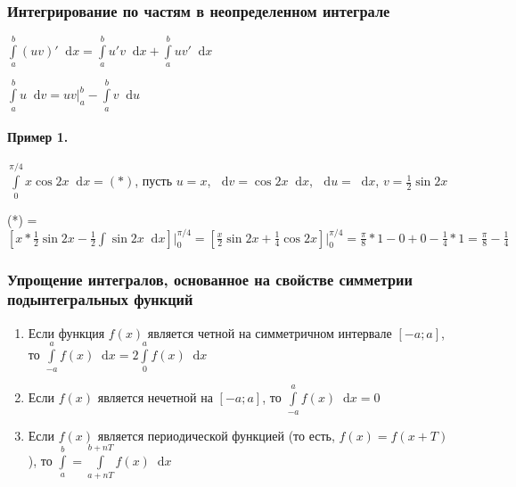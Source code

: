 \documentclass{article}
\newcommand*\diff{\mathop{}\!\mathrm{d}}
\begin{document}
\subsubsection{Интегрирование по частям в неопределенном интеграле}

$\int\limits_{a}^{b} (u v)' \diff x = \int\limits_{a}^{b} u' v \diff x + \int\limits_{a}^{b} u v' \diff x$

$\int\limits_{a}^{b} u \diff v = u v \bigg|_{a}^{b} - \int\limits_{a}^{b} v \diff u$

\paragraph{Пример 1. } $\int\limits_{0}^{\pi/4} x \cos 2x \diff x = (*)$, пусть $u = x$, $\diff v = \cos 2 x \diff x$, $\diff u = \diff x$, $v = \frac{1}{2} \sin 2x$

(*) = $[ x * \frac{1}{2} \sin 2 x - \frac{1}{2} \int \sin 2 x \diff x] \bigg|_{0}^{\pi/4} = [\frac{x}{2} \sin 2x + \frac{1}{4} \cos 2x] \bigg|_{0}^{\pi/4} = \frac{\pi}{8} * 1 - 0 + 0 - \frac{1}{4} * 1 = \frac{\pi}{8} - \frac{1}{4}$

\subsubsection{Упрощение интегралов, основанное на свойстве симметрии подынтегральных функций}

\begin{enumerate}
    \item Если функция $f(x)$ является четной на симметричном интервале $[-a; a]$, то $\int\limits_{-a}^{a} f(x) \diff x = 2 \int\limits_{0}^{a} f(x) \diff x$
    \item Если $f(x)$ является нечетной на $[-a; a]$, то $\int\limits_{-a}^{a} f(x) \diff x = 0$
    \item Если $f(x)$ является периодической функцией (то есть, $f(x) = f(x + T)$), то $\int\limits_{a}^{b} = \int\limits_{a + n T}^{b + n T} f(x) \diff x$
\end{enumerate}
\end{document}
